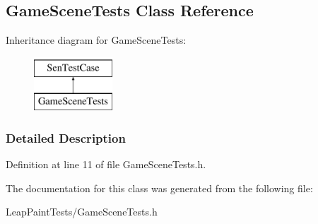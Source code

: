 \hypertarget{interface_game_scene_tests}{\subsection{Game\-Scene\-Tests Class Reference}
\label{d5/def/interface_game_scene_tests}
}
Inheritance diagram for Game\-Scene\-Tests\-:\begin{figure}[H]
\begin{center}
\leavevmode
\includegraphics[height=2.000000cm]{d5/def/interface_game_scene_tests}
\end{center}
\end{figure}


\subsubsection{Detailed Description}


Definition at line 11 of file Game\-Scene\-Tests.\-h.



The documentation for this class was generated from the following file\-:\begin{DoxyCompactItemize}
\item 
Leap\-Paint\-Tests/Game\-Scene\-Tests.\-h\end{DoxyCompactItemize}

